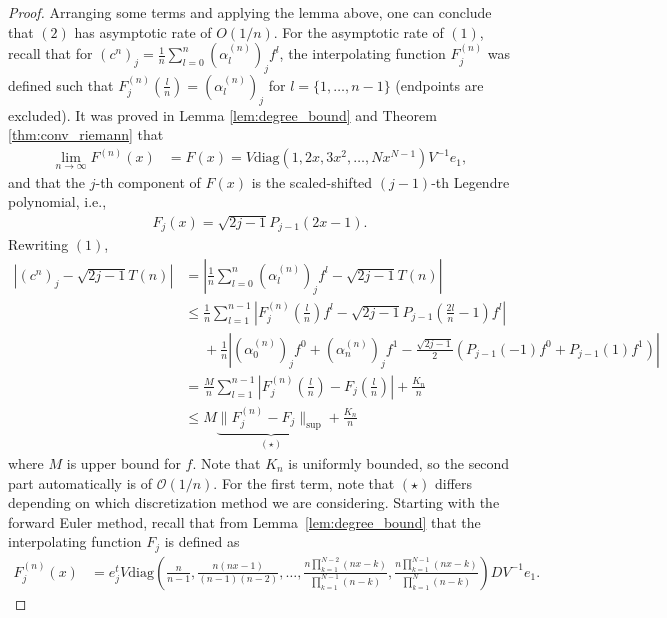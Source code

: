 \documentclass{article}
\theoremstyle{definition}
\newcommand{\pr}[1]{ \left( #1 \right) }
\begin{document}
\begin{proof}
Arranging some terms and applying the lemma above, one can conclude that $(2)$ has asymptotic rate of $O(1/n)$. 
For the asymptotic rate of $(1)$, 
recall that for $\pr{c^n}_j = \frac{1}{n} \sum_{l=0}^n \pr{\alpha_l^{(n)}}_j f^l$, the interpolating function $F^{(n)}_j$ was defined such that $F^{(n)}_j \pr{\frac{l}{n}} = \pr{\alpha^{(n)}_l}_j$ for $l = \{1, \dots, n-1\}$ (endpoints are excluded). It was proved in Lemma 
\ref{lem:degree_bound} and Theorem \ref{thm:conv_riemann} that
\begin{align*}
     \lim_{n \to \infty} F^{(n)}(x) &= F(x) %
     = V \text{diag} \pr{ 1, 2x, 3x^2, \dots, Nx^{N-1}} V^{-1} e_1,
 \end{align*}
and that the $j$-th component of $F(x)$ is the scaled-shifted $(j-1)$-th Legendre polynomial, i.e., 
\begin{align*}
    F_j(x) = \sqrt{2j-1}P_{j-1}(2x-1).
\end{align*}
Rewriting $(1)$,
\begin{align*}
    \left|\pr{c^n}_j - \sqrt{2j-1} T(n) \right| 
    &= \left| \frac{1}{n} \sum_{l=0}^n \pr{\alpha_l^{(n)}}_j f^l - \sqrt{2j-1} T(n)
    \right| \\
    &\leq \frac{1}{n} \sum_{l=1}^{n-1} \left| F^{(n)}_j\pr{\frac{l}{n}}f^l - \sqrt{2j-1} P_{j-1}\pr{\frac{2l}{n}-1}f^l \right| \\
    &\phantom{=}+ \frac{1}{n} \left| \pr{\alpha^{(n)}_0}_j f^0 + \pr{\alpha^{(n)}_n}_j f^1 - \frac{\sqrt{2j-1}}{2}\pr{P_{j-1}(-1)f^0 + P_{j-1}(1)f^1} \right| \\
    &= \frac{M}{n} \sum_{l=1}^{n-1} \left| F^{(n)}_j\pr{\frac{l}{n}} - F_j\pr{\frac{l}{n}} \right| + \frac{K_n}{n} \\
    &\leq M \underbrace{\| F^{(n)}_j - F_j \|_{\sup}}_{(\star)} + \frac{K_n}{n}
\end{align*}
where $M$ is upper bound for $f$. 
Note that $K_n$ is uniformly bounded, so the second part automatically is of $\mathcal{O}(1/n)$. 
For the first term, note that $(\star)$ differs depending on which discretization method we are considering. 
Starting with the forward Euler method, recall that from Lemma~\ref{lem:degree_bound} that the interpolating function $F_j$ is defined as 
 \begin{align*}
     F_j^{(n)}(x) &= e_j^{t} V \text{diag}\pr{ \frac{n}{n-1}, \frac{ n \pr{ nx-1}}{(n-1)(n-2)}, \dots, \frac{n\prod_{k=1}^{N-2}\pr{ nx - k } }{{\prod_{k=1}^{N-1}\pr{ n - k }}}, \frac{n\prod_{k=1}^{N-1}\pr{ nx - k } }{{\prod_{k=1}^{N}\pr{ n - k }}}} D V^{-1} e_1.

\end{align*}
\end{proof}
\end{document}
